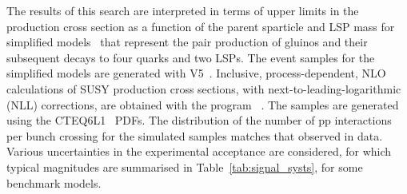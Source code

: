 %
%

The results of this search are interpreted in terms of upper limits in
the production cross section as a function of the parent sparticle and
LSP mass for simplified models~\cite{Alwall:2008ag, Alwall:2008va,
  sms} that represent the pair production of gluinos and their
subsequent decays to four quarks and two LSPs. The event samples for
the simplified models are generated with \MADGRAPH V5~\cite{madgraph}.
Inclusive, process-dependent, NLO calculations of SUSY production
cross sections, with next-to-leading-logarithmic (NLL) corrections,
are obtained with the program \PROSPINO~\cite{Beenakker:1996ch,
  PhysRevD.80.095004,PhysRevLett.102.111802, PhysRevD.80.095004,
  1126-6708-2009-12-041, doi:10.1142/S0217751X11053560,
  susy-nlo-nll}. The samples are generated using the
CTEQ6L1~\cite{Pumplin:2002vw} PDFs. The distribution of the number of
pp interactions per bunch crossing for the simulated samples matches
that observed in data. Various uncertainties in the experimental
acceptance are considered, for which typical magnitudes are summarised
in Table~\ref{tab:signal_systs}, for some benchmark models. 

